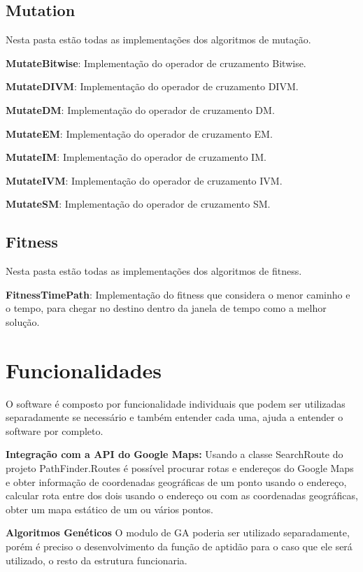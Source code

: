\subsection{Mutation}

Nesta pasta estão todas as implementações dos algoritmos de mutação.

\textbf{MutateBitwise}: Implementação do operador de cruzamento Bitwise.

\textbf{MutateDIVM}: Implementação do operador de cruzamento DIVM.

\textbf{MutateDM}: Implementação do operador de cruzamento DM.

\textbf{MutateEM}: Implementação do operador de cruzamento EM.

\textbf{MutateIM}: Implementação do operador de cruzamento IM.

\textbf{MutateIVM}: Implementação do operador de cruzamento IVM.

\textbf{MutateSM}: Implementação do operador de cruzamento SM.

\subsection{Fitness}

Nesta pasta estão todas as implementações dos algoritmos de fitness.

\textbf{FitnessTimePath}: Implementação do fitness que considera o menor caminho e o tempo, para chegar no destino dentro da janela de tempo como a melhor solução.

\section{Funcionalidades}
O software é composto por funcionalidade individuais que podem ser utilizadas separadamente se necessário e também entender cada uma, ajuda a entender o software por completo.

\textbf{Integração com a API do Google Maps:} Usando a classe SearchRoute do projeto PathFinder.Routes é possível procurar rotas e endereços do Google Maps e obter informação de coordenadas geográficas de um ponto usando o endereço, calcular rota entre dos dois usando o endereço ou com as coordenadas geográficas, obter um mapa estático de um ou vários pontos.


\textbf{Algoritmos Genéticos} O modulo de GA poderia ser utilizado separadamente, porém é preciso o desenvolvimento da função de aptidão para o caso que ele será utilizado, o resto da estrutura funcionaria.